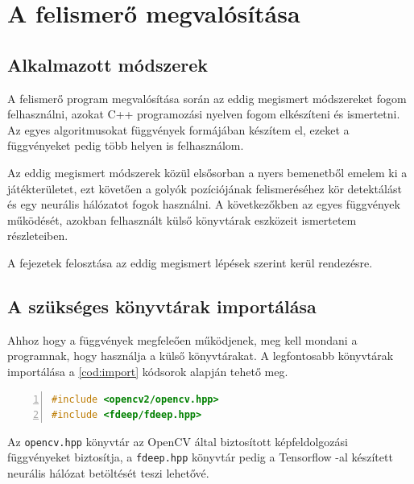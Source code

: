\renewcommand{\lstlistingname}{kódrészlet}

\chapter{A felismerő megvalósítása}
\section{Alkalmazott módszerek}
A felismerő program megvalósítása során az eddig megismert módszereket fogom felhasználni, azokat C++ programozási nyelven fogom elkészíteni és ismertetni. Az egyes algoritmusokat függvények formájában készítem el, ezeket a függvényeket pedig több helyen is felhasználom.
\par Az eddig megismert módszerek közül elsősorban a nyers bemenetből emelem ki a játékterületet, ezt követően a golyók pozíciójának felismeréséhez kör detektálást és egy neurális hálózatot fogok használni. A következőkben az egyes függvények működését, azokban felhasznált külső könyvtárak eszközeit ismertetem részleteiben.
\par A fejezetek felosztása az eddig megismert lépések szerint kerül rendezésre.

\section{A szükséges könyvtárak importálása}
Ahhoz hogy a függvények megfeleően működjenek, meg kell mondani a programnak, hogy használja a külső könyvtárakat.
\newline A legfontosabb könyvtárak importálása a \ref{cod:import} kódsorok alapján tehető meg.

\vspace{5mm}
\hspace{-10mm}
\begin{minipage}{\linewidth}
\begin{lstlisting}[language=C++, numbers=left, caption={Könyvtárak importálása.}, label={cod:import}]
#include <opencv2/opencv.hpp>
#include <fdeep/fdeep.hpp>
\end{lstlisting}
\end{minipage}

\par Az \lstinline{opencv.hpp} könyvtár az OpenCV által biztosított képfeldolgozási függvényeket biztosítja, a \lstinline{fdeep.hpp} könyvtár pedig a Tensorflow -al készített neurális hálózat betöltését teszi lehetővé.

